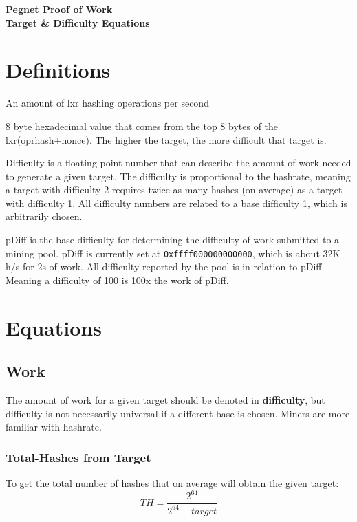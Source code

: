 \documentclass[12pt]{article}
\begin{document}
\begin{center}
{\bf 
Pegnet Proof of Work \\
Target \& Difficulty Equations\\
}

\end{center}

\section{Definitions}

\begin{description}[font=\sffamily\bfseries, leftmargin=1cm, style=nextline]
    \item[Hash-rate]
    An amount of lxr hashing operations per second
    \item[Target]
    8 byte hexadecimal value that comes from the top 8 bytes of the lxr(oprhash+nonce). The higher the target, the more difficult that target is.
    \item[Difficulty]
    Difficulty is a floating point number that can describe the amount of work needed to generate a given target. The difficulty is proportional to the hashrate, meaning a target with difficulty 2 requires twice as many hashes (on average) as a target with difficulty 1. All difficulty numbers are related to a base difficulty 1, which is arbitrarily chosen.
    \item[pDiff]
    pDiff is the base difficulty for determining the difficulty of work submitted to a mining pool. pDiff is currently set at \texttt{0xffff000000000000}, which is about 32K h/s for 2s of work. All difficulty reported by the pool is in relation to pDiff. Meaning a difficulty of 100 is 100x the work of pDiff.
\end{description}

\pagebreak
\section{Equations}

\subsection{Work}

The amount of work for a given target should be denoted in \textbf{difficulty}, but difficulty is not necessarily universal if a different base is chosen. Miners are more familiar with hashrate.


   \subsubsection{Total-Hashes from Target}
    To get the total number of hashes that on average will obtain the given target: \\
    \large{\[
    TH = \frac{2^{64}}{2^{64}-target}
    \]}
    
\end{document}
